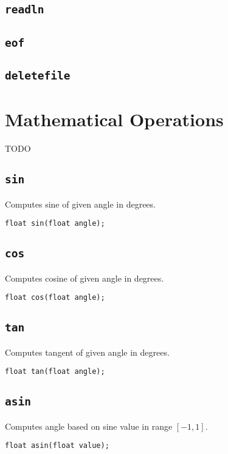 \subsection{\texttt{readln}}
\subsection{\texttt{eof}}
\subsection{\texttt{deletefile}}


\section{Mathematical Operations}

TODO


\subsection{\texttt{sin}}
Computes sine of given angle in degrees.

\begin{lstlisting}
float sin(float angle);
\end{lstlisting}


\subsection{\texttt{cos}}
Computes cosine of given angle in degrees.

\begin{lstlisting}
float cos(float angle);
\end{lstlisting}


\subsection{\texttt{tan}}
Computes tangent of given angle in degrees.

\begin{lstlisting}
float tan(float angle);
\end{lstlisting}


\subsection{\texttt{asin}}
Computes angle based on sine value in range $[-1, 1]$.

\begin{lstlisting}
float asin(float value);
\end{lstlisting}


